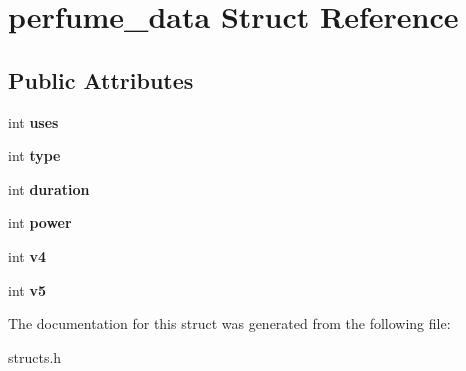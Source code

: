 \hypertarget{structperfume__data}{\section{perfume\-\_\-data Struct Reference}
\label{structperfume__data}
}
\subsection*{Public Attributes}
\begin{DoxyCompactItemize}
\item 
\hypertarget{structperfume__data_abd44f553157c34ce18af6876c89960c4}{int {\bfseries uses}}\label{structperfume__data_abd44f553157c34ce18af6876c89960c4}

\item 
\hypertarget{structperfume__data_a7ecadab65c8d45a95ebda20b74bb5bde}{int {\bfseries type}}\label{structperfume__data_a7ecadab65c8d45a95ebda20b74bb5bde}

\item 
\hypertarget{structperfume__data_a526f9cb6959dfc909bdfc4910400c678}{int {\bfseries duration}}\label{structperfume__data_a526f9cb6959dfc909bdfc4910400c678}

\item 
\hypertarget{structperfume__data_a3ab57bd4c3213b26186b463eb05b3964}{int {\bfseries power}}\label{structperfume__data_a3ab57bd4c3213b26186b463eb05b3964}

\item 
\hypertarget{structperfume__data_ad488be1925bcd5a83f8aaddd81957967}{int {\bfseries v4}}\label{structperfume__data_ad488be1925bcd5a83f8aaddd81957967}

\item 
\hypertarget{structperfume__data_a6909dc4467b01c80d5173394556c26fc}{int {\bfseries v5}}\label{structperfume__data_a6909dc4467b01c80d5173394556c26fc}

\end{DoxyCompactItemize}


The documentation for this struct was generated from the following file\-:\begin{DoxyCompactItemize}
\item 
structs.\-h\end{DoxyCompactItemize}
